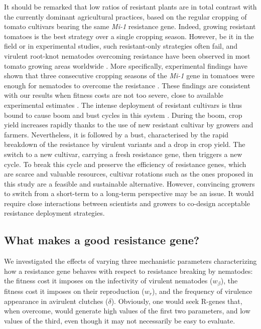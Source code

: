 {{{{It should be remarked that low ratios of resistant plants are in total
contrast with the currently dominant agricultural practices, based on
the regular cropping of tomato cultivars bearing the same
\textit{Mi-1} resistance gene. Indeed, growing resistant tomatoes is
the best strategy over a single cropping season. However, be it in the
field or in experimental studies, such resistant-only strategies often
fail, and virulent {root-knot nematodes} overcoming resistance have
been observed in most tomato growing areas worldwide \citep{Seid2015}.
More specifically, experimental findings have shown that three
consecutive cropping seasons of the \textit{Mi-1} gene in tomatoes
were enough for {nematodes} to overcome the resistance
\citep{Eddaoudi1997,Verdejo-Lucas2009}.  These findings are consistent
with our results when fitness costs are not too severe, close to
available experimental estimates \citep{Castagnone-Sereno2007,
  Djian-Caporalino2011}.  The intense deployment of resistant
cultivars is thus bound to cause boom and bust cycles in this system
\citep{Brown2011}. During the boom, crop yield increases rapidly
thanks to the use of new resistant cultivar by growers and
farmers. Nevertheless, it is followed by a bust, characterised by the
rapid breakdown of the resistance by virulent variants and a drop in
crop yield. The switch to a new cultivar, carrying a fresh resistance
gene, then triggers a new cycle. To break this cycle and preserve the
efficiency of resistance genes, which are scarce and valuable
resources, cultivar rotations such as the ones proposed in this study
are a feasible and sustainable alternative. However, convincing
growers to switch from a short-term to a long-term perspective may be
an issue. It would require close interactions between scientists and
growers to co-design acceptable resistance deployment strategies.

\subsection{What makes a good resistance gene?}

We investigated the effects of varying three mechanistic parameters
characterizing how a resistance gene behaves with respect to
resistance breaking by {nematodes}: the fitness cost it imposes on the
infectivity of virulent nematodes ($w_{\beta}$), the fitness cost it
imposes on their reproduction ($w_{r}$), and the frequency of
virulence appearance in avirulent clutches ($\delta$). Obviously, one
would seek R-genes that, when overcome, would generate high values of
the first two parameters, and low values of the third, even
  though it may not necessarily be easy to evaluate.

}}}}
